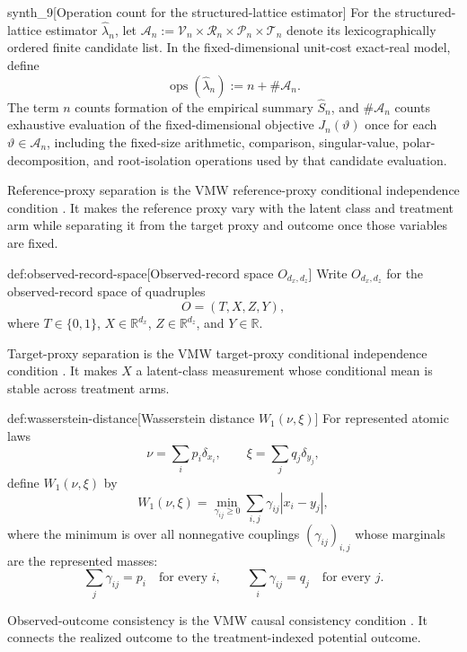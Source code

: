 \begin{definitionv}{synth_9}[Operation count for the structured-lattice estimator]
For the structured-lattice estimator \(\widehat\lambda_n\), let \(\mathcal A_n:=\mathcal V_n\times\mathcal R_n\times\mathcal P_n\times\mathcal T_n\) denote its lexicographically ordered finite candidate list. In the fixed-dimensional unit-cost exact-real model, define\[\operatorname{ops}(\widehat\lambda_n):=n+\#\mathcal A_n.\]The term \(n\) counts formation of the empirical summary \(\widehat S_n\), and \(\#\mathcal A_n\) counts exhaustive evaluation of the fixed-dimensional objective \(J_n(\vartheta)\) once for each \(\vartheta\in\mathcal A_n\), including the fixed-size arithmetic, comparison, singular-value, polar-decomposition, and root-isolation operations used by that candidate evaluation.
\end{definitionv}

Reference-proxy separation is the VMW reference-proxy conditional independence condition \citep{VirkMazaheriWu2026}. It makes the reference proxy vary with the latent class and treatment arm while separating it from the target proxy and outcome once those variables are fixed.

\begin{definitionv}{def:observed-record-space}[Observed-record space \(O_{d_x,d_z}\)]
Write \(O_{d_x,d_z}\) for the observed-record space of quadruples
\[
O=(T,X,Z,Y),
\]
where \(T\in\{0,1\}\), \(X\in\mathbb R^{d_x}\), \(Z\in\mathbb R^{d_z}\), and \(Y\in\mathbb R\).
\end{definitionv}

Target-proxy separation is the VMW target-proxy conditional independence condition \citep{VirkMazaheriWu2026}. It makes \(X\) a latent-class measurement whose conditional mean is stable across treatment arms.

\begin{definitionv}{def:wasserstein-distance}[Wasserstein distance \(W_1(\nu,\xi)\)]
For represented atomic laws
\[
\nu=\sum_i p_i\delta_{x_i},
\qquad
\xi=\sum_j q_j\delta_{y_j},
\]
define \(W_1(\nu,\xi)\) by
\[
W_1(\nu,\xi)
=
\min_{\gamma_{ij}\ge 0}
\sum_{i,j}\gamma_{ij}|x_i-y_j|,
\]
where the minimum is over all nonnegative couplings \((\gamma_{ij})_{i,j}\) whose marginals are the represented masses:
\[
\sum_j \gamma_{ij}=p_i
\quad\text{for every }i,
\qquad
\sum_i \gamma_{ij}=q_j
\quad\text{for every }j.
\]
\end{definitionv}

Observed-outcome consistency is the VMW causal consistency condition \citep{VirkMazaheriWu2026}. It connects the realized outcome to the treatment-indexed potential outcome.

